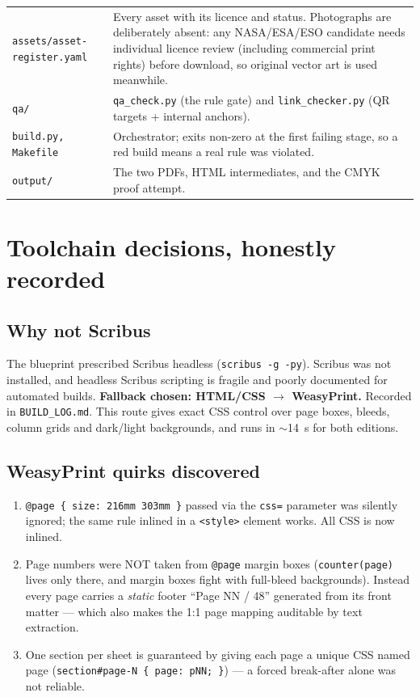 \documentclass[11pt,a4paper]{article}
\newcommand{\code}[1]{\texttt{#1}}
\begin{document}
\begin{longtable}{p{44mm}p{102mm}}
\code{assets/asset-register.yaml} & Every asset with its licence and status.
Photographs are deliberately absent: any NASA/ESA/ESO candidate needs
individual licence review (including commercial print rights) before
download, so original vector art is used meanwhile.\\
\code{qa/} & \code{qa\_check.py} (the rule gate) and \code{link\_checker.py}
(QR targets + internal anchors).\\
\code{build.py, Makefile} & Orchestrator; exits non-zero at the first failing
stage, so a red build means a real rule was violated.\\
\code{output/} & The two PDFs, HTML intermediates, and the CMYK proof attempt.\\
\end{longtable}

\section{Toolchain decisions, honestly recorded}

\subsection{Why not Scribus}
The blueprint prescribed Scribus headless (\code{scribus -g -py}). Scribus was
not installed, and headless Scribus scripting is fragile and poorly documented
for automated builds. \textbf{Fallback chosen: HTML/CSS $\rightarrow$
WeasyPrint.} Recorded in \code{BUILD\_LOG.md}. This route gives exact CSS
control over page boxes, bleeds, column grids and dark/light backgrounds, and
runs in $\sim$14~s for both editions.

\subsection{WeasyPrint quirks discovered}
\begin{enumerate}[leftmargin=6mm,itemsep=1pt]
  \item \code{@page \{ size: 216mm 303mm \}} passed via the \code{css=}
        parameter was silently ignored; the same rule inlined in a
        \code{<style>} element works. All CSS is now inlined.
  \item Page numbers were NOT taken from \code{@page} margin boxes
        (\code{counter(page)} lives only there, and margin boxes fight with
        full-bleed backgrounds). Instead every page carries a \emph{static}
        footer ``Page NN / 48'' generated from its front matter --- which also
        makes the 1:1 page mapping auditable by text extraction.
  \item One section per sheet is guaranteed by giving each page a unique CSS
        named page (\code{section\#page-N \{ page: pNN; \}}) --- a forced
        break-after alone was not reliable.
\end{enumerate}
\end{document}
